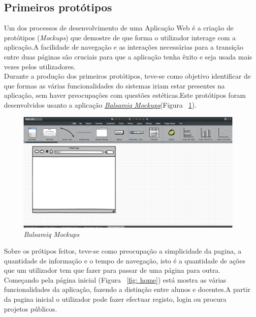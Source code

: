 \subsection{Primeiros protótipos}

Um dos processos de desenvolvimento de uma Aplicação Web é a criação de protótipos (\emph{Mockups}) que demostre de que forma o utilizador interage com a aplicação.A facilidade de navegação e as interações necessárias para a transição entre duas páginas são cruciais para que a aplicação tenha êxito e seja usada mais vezes pelos utilizadores. \\
Durante a produção dos primeiros protótipos, teve-se como objetivo identificar de que formas as várias funcionalidades do sistemas iriam estar presentes na aplicação, sem haver preocupações com questões estéticas.Este protótipos foram desenvolvidos usanto a aplicação \href{http://balsamiq.com/products/mockups/}{\emph{Balsamiq Mockups}}(Figura ~\ref{fig: balsamiq}).\\

 \begin{figure}[htbp]
        \centering
        \includegraphics[width=1\textwidth]{images/prototipos/mockups/balsamiq.png}
         \caption{\emph{Balsamiq Mockups}}
         \label{fig: balsamiq}
\end{figure}

Sobre os prótipos feitos, teve-se como preocupação a simplicidade da pagina, a quantidade de informação e o tempo de navegação, isto é a quantidade de ações que um utilizador tem que fazer para passar de uma página para outra.\\
Começando pela página inicial (Figura ~\ref{fig: home}) está mostra as várias funcionalidades da aplicação, fazendo a distinção entre alunos e docentes.A partir da pagina inicial o utilizador pode fazer efectuar registo, login ou procura projetos públicos. \\


